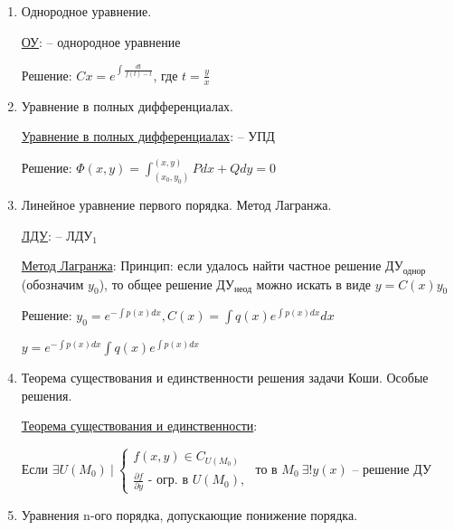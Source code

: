 \documentclass[12pt]{article}
\begin{document}
\begin{enumerate}
        \item Однородное уравнение.

        \hyperlink{homogeneousequation}{ОУ}:  -- однородное уравнение

        Решение: $Cx = e^{\int\frac{dt}{f(t) - t}}$, где $t = \frac{y}{x}$

        \item Уравнение в полных дифференциалах.

        \hyperlink{equationincompletedifferentials}{Уравнение в полных дифференциалах}:  -- УПД

        Решение: $\Phi(x, y) = \int^{(x,y)}_{(x_0,y_0)} Pdx + Qdy = 0$

        \item Линейное уравнение первого порядка. Метод Лагранжа.

        \hyperlink{lineardifferentialequation}{ЛДУ}:  -- ЛДУ$_1$

        \hyperlink{methodLagrange}{Метод Лагранжа}: Принцип: если удалось найти частное решение ДУ$_\text{однор}$ (обозначим $y_0$), то общее решение ДУ$_\text{неод}$
        можно искать в виде $y = C(x)y_0$

        Решение: $y_0 = e^{-\int p(x) dx}, C(x) = \int q(x) e^{\int p(x)dx} dx$

        $y = e^{-\int p(x) dx} \int q(x) e^{\int p(x)dx} $

        \item Теорема существования и единственности решения задачи Коши. Особые решения.

        \hyperlink{existenceanduniquenessofsolution}{Теорема существования и единственности}: 
        \begin{MyTheorem}
            \Ths Если $\exists U(M_0) \ | \
            \begin{cases}
                f(x,y) \in C_{U(M_0)} \\
                \frac{\partial f}{\partial y}\text{ - огр. в } U(M_0),
            \end{cases}$ то в $M_0\ \exists! y(x)$ -- решение ДУ
        \end{MyTheorem}


        \item Уравнения n-ого порядка, допускающие понижение порядка.


\end{enumerate}
\end{document}
